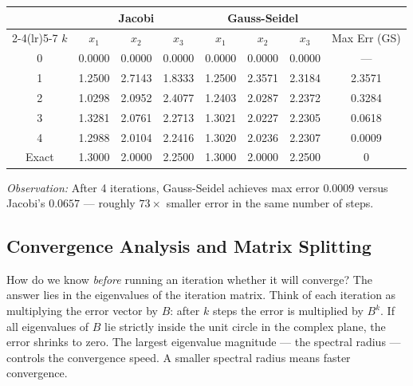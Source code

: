\documentclass[12pt,a4paper]{article}
\begin{document}
\begin{center}
\begin{tabular}{@{}c ccc ccc c@{}}
\toprule
& \multicolumn{3}{c}{\textbf{Jacobi}} & \multicolumn{3}{c}{\textbf{Gauss-Seidel}} & \\
\cmidrule(lr){2-4}\cmidrule(lr){5-7}
\(k\) & \(x_1\) & \(x_2\) & \(x_3\) & \(x_1\) & \(x_2\) & \(x_3\) & Max Err (GS) \\
\midrule
0 & 0.0000 & 0.0000 & 0.0000 & 0.0000 & 0.0000 & 0.0000 & --- \\
1 & 1.2500 & 2.7143 & 1.8333 & 1.2500 & 2.3571 & 2.3184 & 2.3571 \\
2 & 1.0298 & 2.0952 & 2.4077 & 1.2403 & 2.0287 & 2.2372 & 0.3284 \\
3 & 1.3281 & 2.0761 & 2.2713 & 1.3021 & 2.0227 & 2.2305 & 0.0618 \\
4 & 1.2988 & 2.0104 & 2.2416 & 1.3020 & 2.0236 & 2.2307 & 0.0009 \\
Exact & 1.3000 & 2.0000 & 2.2500 & 1.3000 & 2.0000 & 2.2500 & 0 \\
\bottomrule
\end{tabular}
\end{center}

\textit{Observation:} After 4 iterations, Gauss-Seidel achieves max error \(0.0009\)
versus Jacobi's \(0.0657\) --- roughly \(73\times\) smaller error in the same number of steps.

\subsection{Convergence Analysis and Matrix Splitting}

How do we know \emph{before} running an iteration whether it will converge?
The answer lies in the eigenvalues of the iteration matrix. Think of each iteration as
multiplying the error vector by \(B\): after \(k\) steps the error is multiplied by \(B^k\).
If all eigenvalues of \(B\) lie strictly inside the unit circle in the complex plane,
the error shrinks to zero. The largest eigenvalue magnitude --- the spectral radius ---
controls the convergence speed. A smaller spectral radius means faster convergence.
\end{document}
